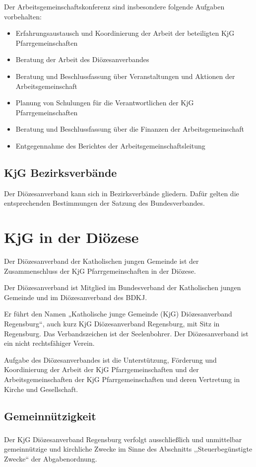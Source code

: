 \documentclass[12pt]{report}
\begin{document}
\begin{flushleft}
Der Arbeitsgemeinschaftskonferenz sind insbesondere folgende Aufgaben vorbehalten:
\begin{itemize}
  \item Erfahrungsaustausch und Koordinierung der Arbeit der beteiligten KjG Pfarrgemeinschaften
  \item Beratung der Arbeit des Diözesanverbandes
  \item Beratung und Beschlussfassung über Veranstaltungen und Aktionen der Arbeitsgemeinschaft
  \item Planung von Schulungen für die Verantwortlichen der KjG Pfarrgemeinschaften
  \item Beratung und Beschlussfassung über die Finanzen der Arbeitsgemeinschaft
  \item Entgegennahme des Berichtes der Arbeitsgemeinschaftsleitung
\end{itemize}
\section{KjG Bezirksverbände}
Der Diözesanverband kann sich in Bezirksverbände gliedern. Dafür gelten die entsprechenden
Bestimmungen der Satzung des Bundesverbandes.
\chapter{KjG in der Diözese}
Der Diözesanverband der Katholischen jungen Gemeinde ist der Zusammenschluss der
KjG Pfarrgemeinschaften in der Diözese.

Der Diözesanverband ist Mitglied im Bundesverband der Katholischen jungen Gemeinde und im
Diözesanverband des BDKJ.

Er führt den Namen „Katholische junge Gemeinde (KjG) Diözesanverband Regensburg“,
auch kurz KjG Diözesanverband Regensburg, mit Sitz in Regensburg.
Das Verbandszeichen ist der Seelenbohrer.
Der Diözesanverband ist ein nicht rechtsfähiger Verein.

Aufgabe des Diözesanverbandes ist die Unterstützung, Förderung und Koordinierung der Arbeit
der KjG Pfarrgemeinschaften und der Arbeitsgemeinschaften der KjG Pfarrgemeinschaften und
deren Vertretung in Kirche und Gesellschaft.

\section{Gemeinnützigkeit}

\subsection{}
Der KjG Diözesanverband Regensburg verfolgt ausschließlich und unmittelbar gemeinnützige
und kirchliche Zwecke im Sinne des Abschnitts ,,Steuerbegünstigte Zwecke`` der Abgabenordnung.


\end{flushleft}
\end{document}
